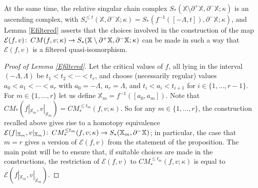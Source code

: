 \documentclass[11pt]{amsart}
\theoremstyle{definition}
\theoremstyle{remark}
\numberwithin{equation}{section}
\def\co{\colon\thinspace}
\begin{document}
At the same time, the relative singular chain complex $S_*(\mathbb{X}\setminus\partial^+\mathbb{X},\partial^-\mathbb{X};\kappa)$ is an ascending complex, with $S_{*}^{\leq t}(\mathbb{X},\partial^-\mathbb{X};\kappa)=S_*(f^{-1}([-\Lambda,t]),\partial^-\mathbb{X};\kappa)$, and Lemma \ref{Efiltered} asserts that the choices involved in the construction of the map $\mathcal{E}(f,v)\co CM(f,v;\kappa)\to S_*(\mathbb{X}\setminus\partial^+\mathbb{X},\partial^-\mathbb{X};\kappa)$ can be made in such a way that $\mathcal{E}(f,v)$ is a filtered quasi-isomorphism.





\begin{proof}[Proof of Lemma \ref{Efiltered}]
	
	Let the critical values of $f$, all lying in the interval $(-\Lambda,\Lambda)$ be $t_1<t_2<\cdots <t_r$, and choose (necessarily regular) values $a_0<a_1<\cdots<a_r$ with $a_0=-\Lambda$, $a_r=\Lambda$, and $t_i<a_i<t_{i+1}$ for $i\in\{1,\ldots,r-1\}$.  For $m\in\{1,\ldots,r\}$ let us define $\mathbb{X}_m=f^{-1}([a_0,a_m])$.  Note that $CM_{*}(f|_{\mathbb{X}_m},v|_{\mathbb{X}_m})=CM_{*}^{\leq t_m}(f,v;\kappa)$.  So for any $m\in \{1,\ldots,r\}$, the construction recalled above gives rise to a homotopy equivalence $\mathcal{E}(f|_{\mathbb{X}_m},v|_{\mathbb{X}_m})\co CM_{*}^{\leq t_m}(f,v;\kappa)\to S_*(\mathbb{X}_m,\partial^-\mathbb{X})$; in particular, the case that $m=r$ gives a version of $\mathcal{E}(f,v)$ from the statement of the proposition.  The main point will be to ensure that, if suitable choices are made in the constructions, the restriction of $\mathcal{E}(f,v)$ to $CM_{*}^{\leq t_m}(f,v;\kappa)$ is equal to $\mathcal{E}(f|_{\mathbb{X}_m},v|_{\mathbb{X}_m})$.
	

\end{proof}
\end{document}
